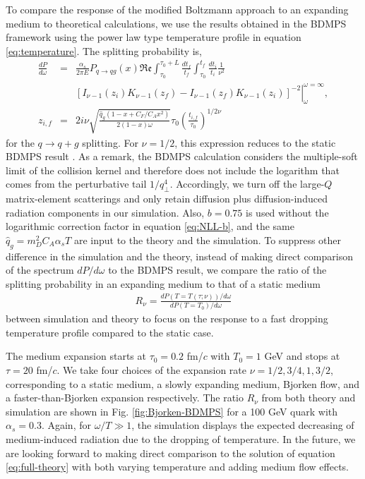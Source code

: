 \documentclass[aps, prc, reprint, amsmath, groupedaddress, nofootinbib]{revtex4-1}
\begin{document}
To compare the response of the modified Boltzmann approach to an expanding medium to theoretical calculations, we use the results obtained in the BDMPS framework \cite{Baier:1998yf} using the power law type temperature profile in equation \ref{eq:temperature}. 
The splitting probability is,
\begin{eqnarray}
\frac{dP}{d\omega} &=& \frac{\alpha_s}{2\pi E}P_{q\rightarrow qg}(x)\mathfrak{Re}\int_{\tau_0}^{\tau_0+L}\frac{dt_f}{t_f}\int_{\tau_0}^{t_f}\frac{dt_i}{t_i} \frac{1}{\nu^2}\\
\nonumber
&& \left.\left[ I_{\nu-1}(z_i)K_{\nu-1}(z_f)-I_{\nu-1}(z_f)K_{\nu-1}(z_i)\right]^{-2}\right|_{\omega}^{\omega=\infty},\\
z_{i,f} &=& 2i\nu \sqrt{\frac{\hat{q}_g(1-x+C_F/C_A x^2)}{2(1-x)\omega}} \tau_0 \left( \frac{t_{i,f}}{\tau_0}\right) ^{1/2\nu}
\end{eqnarray}
for the $q\rightarrow q+g$ splitting.
For $\nu=1/2$, this expression reduces to the static BDMPS result \cite{Baier:1996kr}. 
As a remark, the BDMPS calculation considers the multiple-soft limit of the collision kernel and therefore does not include the logarithm that comes from the perturbative tail $1/q_\perp^4$. 
Accordingly, we turn off the large-$Q$ matrix-element scatterings and only retain diffusion plus diffusion-induced radiation components in our simulation.
Also, $b=0.75$ is used without the logarithmic correction factor in equation \ref{eq:NLL-b}, and the same $\hat{q}_g = m_D^2 C_A\alpha_s T$ are input to the theory and the simulation.
To suppress other difference in the simulation and the theory, instead of making direct comparison of the spectrum $dP/d\omega$ to the BDMPS result, we compare the ratio of the splitting probability in an expanding medium to that of a static medium
\begin{eqnarray}
R_\nu = \frac{dP(T=T(\tau;\nu))/d\omega}{dP(T=T_0)/d\omega}
\end{eqnarray}
between simulation and theory to focus on the response to a fast dropping temperature profile compared to the static case.

The medium expansion starts at $\tau_0=0.2$ fm/$c$ with $T_0=1$ GeV and stops at $\tau = 20$ fm/$c$.
We take four choices of the expansion rate $\nu = 1/2, 3/4, 1, 3/2$, corresponding to a static medium, a slowly expanding medium, Bjorken flow, and a faster-than-Bjorken expansion respectively.
The ratio $R_\nu$ from both theory and simulation are shown in Fig. \ref{fig:Bjorken-BDMPS} for a 100 GeV quark with $\alpha_s=0.3$.
Again, for $\omega/T \gg 1$, the simulation displays the expected decreasing of medium-induced radiation due to the dropping of temperature.
In the future, we are looking forward to making direct comparison to the solution of equation \ref{eq:full-theory} with both varying temperature and adding medium flow effects.
\end{document}
